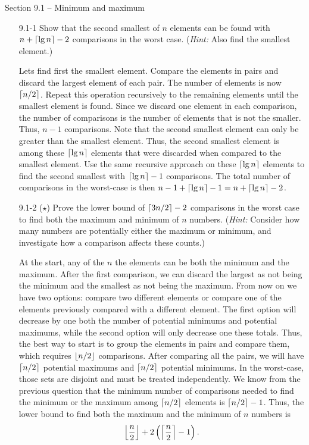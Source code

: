 
{\large Section 9.1 {--} Minimum and maximum}

\begin{enumerate}

\item[9.1{-}1]{Show that the second smallest of $n$ elements can be found with
$n + \lceil\lg n\rceil - 2$ comparisons in the worst case. (\emph{Hint:} Also find
the smallest element.)}

\begin{framed}
Lets find first the smallest element. Compare the elements in pairs and discard
the largest element of each pair. The number of elements is now $\lceil n/2\rceil$.
Repeat this operation recursively to the remaining elements until the smallest
element is found. Since we discard one element in each comparison, the number of
comparisons is the number of elements that is not the smaller.  Thus, $n - 1$
comparisons. Note that the second smallest element can only be greater than the
smallest element. Thus, the second smallest element is among these
$\lceil\lg n\rceil$ elements that were discarded when compared to the smallest
element. Use the same recursive approach on these $\lceil\lg n\rceil$ elements to
find the second smallest with $\lceil\lg n\rceil - 1$ comparisons. The total number
of comparisons in the worst-case is then $n - 1 + \lceil\lg n\rceil
- 1 = n + \lceil\lg n\rceil - 2$.
\end{framed}

\item[9.1{-}2]{($\star$) Prove the lower bound of $\lceil3n/2\rceil - 2$ comparisons
in the worst case to find both the maximum and minimum of $n$ numbers.
(\emph{Hint:} Consider how many numbers are potentially either the maximum or
minimum, and investigate how a comparison affects these counts.)}

\begin{framed}
At the start, any of the $n$ the elements can be both the minimum and the
maximum. After the first comparison, we can discard the largest as not being the
minimum and the smallest as not being the maximum. From now on we have two
options: compare two different elements or compare one of the elements
previously compared with a different element. The first option will decrease by
one both the number of potential minimums and potential maximums, while the
second option will only decrease one these totals. Thus, the best way to start
is to group the elements in pairs and compare them, which requires $\lfloor n/2\rfloor$
comparisons. After comparing all the pairs, we will have $\lceil n/2\rceil$ potential
maximums and $\lceil n/2\rceil$ potential minimums. In the worst-case, those sets are
disjoint and must be treated independently. We know from the previous question
that the minimum number of comparisons needed to find the minimum or the maximum
among $\lceil n/2\rceil$ elements is $\lceil n/2\rceil - 1$. Thus, the lower bound to find
both the maximum and the minimum of $n$ numbers is
\[
  \Bigl\lfloor \frac{n}{2} \Bigr\rfloor + 2 \left( \Bigl\lceil \frac{n}{2} \Bigr\rceil - 1 \right).
\]


\end{framed}
\end{enumerate}
